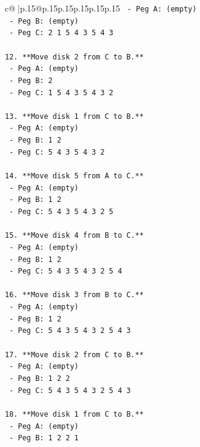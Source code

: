 \documentclass{article}
\begin{document}
{\begin{supertabular}{c@{$\;$}|p{.15\linewidth}@{}p{.15\linewidth}p{.15\linewidth}p{.15\linewidth}p{.15\linewidth}p{.15\linewidth}}
{{{\texttt{    {-} Peg A: (empty)} \\
\texttt{    {-} Peg B: (empty)} \\
\texttt{    {-} Peg C: 2 1 5 4 3 5 4 3} \\
\\ 
\texttt{12. **Move disk 2 from C to B.**} \\
\texttt{    {-} Peg A: (empty)} \\
\texttt{    {-} Peg B: 2} \\
\texttt{    {-} Peg C: 1 5 4 3 5 4 3 2} \\
\\ 
\texttt{13. **Move disk 1 from C to B.**} \\
\texttt{    {-} Peg A: (empty)} \\
\texttt{    {-} Peg B: 1 2} \\
\texttt{    {-} Peg C: 5 4 3 5 4 3 2} \\
\\ 
\texttt{14. **Move disk 5 from A to C.**} \\
\texttt{    {-} Peg A: (empty)} \\
\texttt{    {-} Peg B: 1 2} \\
\texttt{    {-} Peg C: 5 4 3 5 4 3 2 5} \\
\\ 
\texttt{15. **Move disk 4 from B to C.**} \\
\texttt{    {-} Peg A: (empty)} \\
\texttt{    {-} Peg B: 1 2} \\
\texttt{    {-} Peg C: 5 4 3 5 4 3 2 5 4} \\
\\ 
\texttt{16. **Move disk 3 from B to C.**} \\
\texttt{    {-} Peg A: (empty)} \\
\texttt{    {-} Peg B: 1 2} \\
\texttt{    {-} Peg C: 5 4 3 5 4 3 2 5 4 3} \\
\\ 
\texttt{17. **Move disk 2 from C to B.**} \\
\texttt{    {-} Peg A: (empty)} \\
\texttt{    {-} Peg B: 1 2 2} \\
\texttt{    {-} Peg C: 5 4 3 5 4 3 2 5 4 3} \\
\\ 
\texttt{18. **Move disk 1 from C to B.**} \\
\texttt{    {-} Peg A: (empty)} \\
\texttt{    {-} Peg B: 1 2 2 1} \\
}}}
\end{supertabular}}
\end{document}
